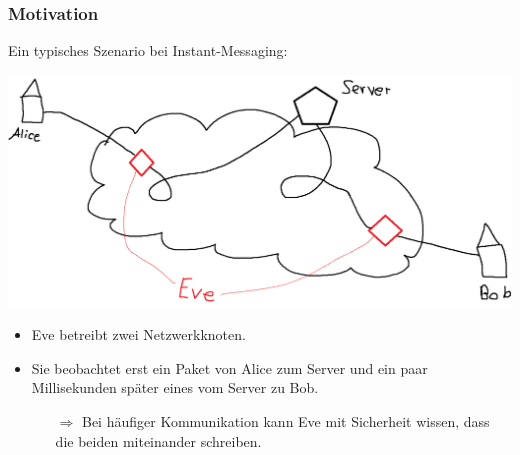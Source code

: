 \documentclass[t]{beamer}
\begin{document}
    \begin{frame}
        \frametitle{Motivation}
        \pause

        Ein typisches Szenario bei Instant-Messaging:
        \pause

        \centering\includegraphics[scale=0.3]{Szenario.png}
        \pause

        \begin{itemize}
            \item
                Eve betreibt zwei Netzwerkknoten.
                \pause

            \item
                Sie beobachtet erst ein Paket von Alice zum Server und ein paar Millisekunden später eines vom Server zu Bob.
                \pause
                \begin{itemize}
                    \item[$\Rightarrow$]
                        Bei häufiger Kommunikation kann Eve mit Sicherheit wissen, dass die beiden miteinander schreiben.
                \end{itemize}
        \end{itemize}
    \end{frame}
\end{document}
